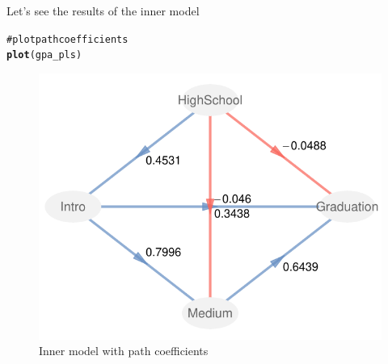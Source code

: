 \documentclass[12pt]{book}\usepackage{graphicx, color}
\makeatletter
\newcommand{\hlfunctioncall}[1]{\textcolor[rgb]{0.501960784313725,0,0.329411764705882}{\textbf{#1}}}%
\newcommand{\hlcomment}[1]{\textcolor[rgb]{0.180392156862745,0.6,0.341176470588235}{#1}}%
\newenvironment{kframe}{%
 \def\at@end@of@kframe{}%
 \ifinner\ifhmode%
  \def\at@end@of@kframe{\end{minipage}}%
  \begin{minipage}{\columnwidth}%
 \fi\fi%
 \def\FrameCommand##1{\hskip\@totalleftmargin \hskip-\fboxsep
 \colorbox{shadecolor}{##1}\hskip-\fboxsep
     \hskip-\linewidth \hskip-\@totalleftmargin \hskip\columnwidth}%
 \MakeFramed {\advance\hsize-\width
   \@totalleftmargin\z@ \linewidth\hsize
   \@setminipage}}%
 {\par\unskip\endMakeFramed%
 \at@end@of@kframe}
\newenvironment{knitrout}{}{} %
\makeatother
\begin{document}
Let's see the results of the inner model
\begin{knitrout}
\color{fgcolor}\begin{kframe}
\begin{alltt}
\hlcomment{# plot path coefficients}
\hlfunctioncall{plot}(gpa_pls)
\end{alltt}
\end{kframe}\begin{figure}[h]


{\centering \includegraphics[width=.7\linewidth,height=.5\linewidth]{figure/gpa_inner_model} 

}

\caption[Inner model with path coefficients]{Inner model with path coefficients\label{fig:gpa_inner_model}}
\end{figure}


\end{knitrout}
\end{document}
